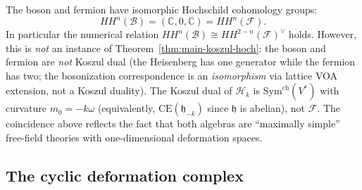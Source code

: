 \begin{remark}
The boson and fermion have isomorphic Hochschild cohomology groups:
\[
HH^n(\mathcal{B}) = (\mathbb{C}, 0, \mathbb{C}) = HH^n(\mathcal{F}).
\]
In particular the numerical relation $HH^n(\mathcal{B}) \cong HH^{2-n}(\mathcal{F})^{\vee}$ holds.
However, this is \emph{not} an instance of Theorem~\ref{thm:main-koszul-hoch}: the boson and fermion are
\emph{not} Koszul dual (the Heisenberg has one generator
while the fermion has two; the bosonization correspondence is an \emph{isomorphism} via lattice VOA extension, not a Koszul duality).  The Koszul dual of $\mathcal{H}_k$ is $\mathrm{Sym}^{\mathrm{ch}}(V^*)$ with curvature $m_0 = -k\omega$ (equivalently, $\mathrm{CE}(\mathfrak{h}_{-k})$ since $\mathfrak{h}$ is abelian),
not $\mathcal{F}$.  The coincidence above reflects the fact that both algebras are
``maximally simple'' free-field theories with one-dimensional deformation spaces.
\end{remark}

\subsection{The cyclic deformation complex}
\label{subsec:cyclic-deformation}

